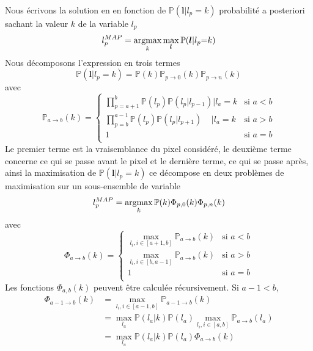 \documentclass[../main/These_Mathias_Paget.tex]{subfiles}
\begin{document}
Nous écrivons la solution en en fonction de $\mathbb{P}(\boldsymbol{l}|l_p{=}k)$ probabilité a posteriori sachant la valeur $k$ de la variable $l_p$
\begin{equation}
l^{MAP}_p = \argmax_{k}{\max_{\boldsymbol{l}}{\mathbb{P}(\boldsymbol{l}|l_p{=}k)}}
\end{equation}
Nous décomposons l'expression en trois termes
\begin{equation}
\mathbb{P}(\boldsymbol{l}|l_p{=}k) = \mathbb{P}(k)\mathbb{P}_{p \rightarrow 0}(k)\mathbb{P}_{p \rightarrow n}(k)
\label{eq:MAP:bayes}
\end{equation}
avec
\begin{equation}
\mathbb{P}_{a \rightarrow b}(k) =
  \begin{cases}
    \prod_{p=a{+}1}^{b}{\mathbb{P}(l_p)\mathbb{P}(l_p|l_{p-1})} | l_a = k & \text{si $a < b$} \\
    \prod_{p=b}^{a-1}{\mathbb{P}(l_p)\mathbb{P}(l_p|l_{p+1})} \; \; \; \; | l_a = k & \text{si $a > b$} \\  
     1 & \text{si $a = b$} \\      
  \end{cases}
\end{equation}
Le premier terme est la vraisemblance du pixel considéré, le deuxième terme concerne ce qui se passe avant le pixel et le dernière terme, ce qui se passe après, ainsi la maximisation de $\mathbb{P}(\boldsymbol{l}|l_p{=}k)$ ce décompose en deux problèmes de maximisation sur un sous-ensemble de variable
\begin{equation}
l_p^{MAP} =  \argmax_{k}{\mathbb{P}(k)\Phi_{p,0}(k)\Phi_{p,n}(k)}
\label{eq:MAP_DP}
\end{equation}
avec 
\begin{equation}
\Phi_{a \rightarrow b}(k) =
  \begin{cases}
  \max_{l_i, i \in [a+1,b]}{\mathbb{P}_{a \rightarrow b}(k)} & \text{si $a < b$} \\
   \max_{l_i, i \in [b,a-1]}{\mathbb{P}_{a \rightarrow b}(k)}  & \text{si $a > b$} \\  
    1 & \text{si $a = b$} \\      
  \end{cases}
\end{equation}
Les fonctions $\Phi_{a,b}(k)$ peuvent être calculée récursivement. Si ${a{-}1}<b$,
\begin{equation}
\begin{aligned}
\Phi_{a{-}1 \rightarrow b}(k) &= \max_{l_i, i \in [a{-}1,b]}{\mathbb{P}_{a{-}1 \rightarrow b}(k)}  \\
&= \max_{l_a}{\mathbb{P}(l_a|k)\mathbb{P}(l_a)\max_{l_i, i \in [a,b]}{\mathbb{P}_{a \rightarrow b}(l_a)}} \\
&= \max_{l_a}{\mathbb{P}(l_a|k)\mathbb{P}(l_a)\Phi_{a\rightarrow b}(k)}
\end{aligned}
\label{eq:recu_1}
\end{equation}
\end{document}
